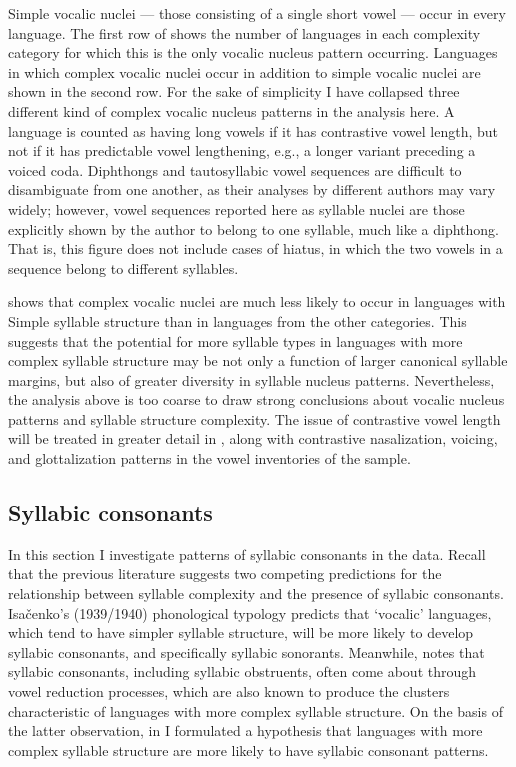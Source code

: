   Simple vocalic nuclei — those consisting of a single short vowel — occur in every language. The first row of  shows the number of languages in each complexity category for which this is the only vocalic nucleus pattern occurring. Languages in which complex vocalic nuclei occur in addition to simple vocalic nuclei are shown in the second row. For the sake of simplicity I have collapsed three different kind of complex vocalic nucleus patterns in the analysis here. A language is counted as having long vowels if it has contrastive vowel length, but not if it has predictable vowel lengthening, e.g., a longer variant preceding a voiced coda. Diphthongs and tautosyllabic vowel sequences are difficult to disambiguate from one another, as their analyses by different authors may vary widely; however, vowel sequences reported here as syllable nuclei are those explicitly shown by the author to belong to one syllable, much like a diphthong. That is, this figure does not include cases of hiatus, in which the two vowels in a sequence belong to different syllables.

   shows that complex vocalic nuclei are much less likely to occur in languages with Simple syllable structure than in languages from the other categories. This suggests that the potential for more syllable types in languages with more complex syllable structure may be not only a function of larger canonical syllable margins, but also of greater diversity in syllable nucleus patterns. Nevertheless, the analysis above is too coarse to draw strong conclusions about vocalic nucleus patterns and syllable structure complexity. The issue of contrastive vowel length will be treated in greater detail in , along with contrastive nasalization, voicing, and glottalization patterns in the vowel inventories of the sample.

\subsection{Syllabic consonants}\label{sec:3.3.5}

  In this section I investigate patterns of syllabic consonants in the data. Recall that the previous literature suggests two competing predictions for the relationship between syllable complexity and the presence of syllabic consonants. Isačenko’s (1939/1940) phonological typology predicts that ‘vocalic’ languages, which tend to have simpler syllable structure, will be more likely to develop syllabic consonants, and specifically syllabic sonorants. Meanwhile, \citet{Bell1978a} notes that syllabic consonants, including syllabic obstruents, often come about through vowel reduction processes, which are also known to produce the clusters characteristic of languages with more complex syllable structure. On the basis of the latter observation, in  I formulated a hypothesis that languages with more complex syllable structure are more likely to have syllabic consonant patterns.


